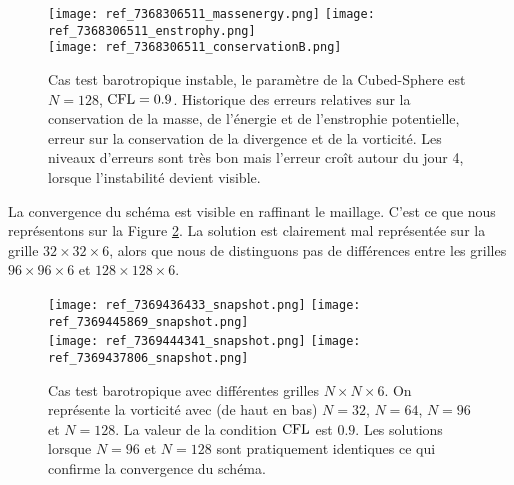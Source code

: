 \begin{figure}[htbp]
\begin{center}
\texttt{[image: ref\_7368306511\_massenergy.png]}
\texttt{[image: ref\_7368306511\_enstrophy.png]}\\
\texttt{[image: ref\_7368306511\_conservationB.png]}
\end{center}
\caption{Cas test barotropique instable, le paramètre de la Cubed-Sphere est $N=128$, $\text{CFL}=0.9$. Historique des erreurs relatives sur la conservation de la masse, de l'énergie et de l'enstrophie potentielle, erreur sur la conservation de la divergence et de la vorticité. Les niveaux d'erreurs sont très bon mais l'erreur croît autour du jour 4, lorsque l'instabilité devient visible.}
\label{fig: galewsky conservation}
\end{figure}

La convergence du schéma est visible en raffinant le maillage. C'est ce que nous représentons sur la Figure \ref{fig: galewsky convergence}. La solution est clairement mal représentée sur la grille $32 \times 32 \times 6$, alors que nous de distinguons pas de différences entre les grilles $96 \times 96\times 6$ et $128 \times 128\times 6$.

\begin{figure}[htbp]
\begin{center}
\texttt{[image: ref\_7369436433\_snapshot.png]}
\texttt{[image: ref\_7369445869\_snapshot.png]}\\
\texttt{[image: ref\_7369444341\_snapshot.png]}
\texttt{[image: ref\_7369437806\_snapshot.png]}
\end{center}
\caption{Cas test barotropique avec différentes grilles $N \times N \times 6$. On représente la vorticité avec (de haut en bas) $N=32$, $N=64$, $N=96$ et $N=128$. La valeur de la condition $\text{CFL}$ est $0.9$. Les solutions lorsque $N=96$ et $N=128$ sont pratiquement identiques ce qui confirme la convergence du schéma.}
\label{fig: galewsky convergence}
\end{figure}



























